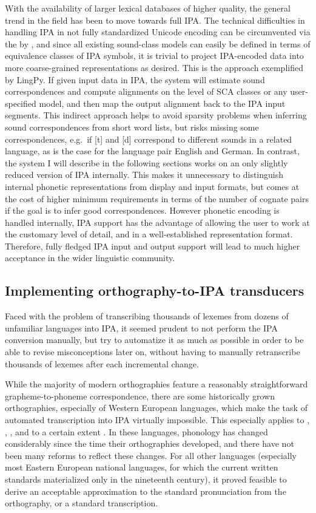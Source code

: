 With the availability of larger lexical databases of higher quality, the general trend in the field has been to move towards full IPA. The technical difficulties in handling IPA in not fully standardized Unicode encoding can be circumvented via the  by \cite{wells1995}, and since all existing sound-class models can easily be defined in terms of equivalence classes of IPA symbols, it is trivial to project IPA-encoded data into more coarse-grained representations as desired. This is the approach exemplified by LingPy. If given input data in IPA, the system will estimate sound correspondences and compute alignments on the level of SCA classes or any user-specified model, and then map the output alignment back to the IPA input segments. This indirect approach helps to avoid sparsity problems when inferring sound correspondences from short word lists, but risks missing some correspondences, e.g.\ if [t] and [d] correspond to different sounds in a related language, as is the case for the language pair English and German. In contrast, the system I will describe in the following sections works on an only slightly reduced version of IPA internally. This makes it unnecessary to distinguish internal phonetic representations from display and input formats, but comes at the cost of higher minimum requirements in terms of the number of cognate pairs if the goal is to infer good correspondences. However phonetic encoding is handled internally, IPA support has the advantage of allowing the user to work at the customary level of detail, and in a well-established representation format. Therefore, fully fledged IPA input and output support will lead to much higher acceptance in the wider linguistic community.

\subsection{Implementing orthography-to-IPA transducers}
Faced with the problem of transcribing thousands of lexemes from dozens of unfamiliar languages into IPA, it seemed prudent to not perform the IPA conversion manually, but try to automatize it as much as possible in order to be able to revise misconceptions later on, without having to manually retranscribe thousands of lexemes after each incremental change.

While the majority of modern orthographies feature a reasonably straightforward grapheme-to-phoneme correspondence, there are some historically grown orthographies, especially of Western European languages, which make the task of automated transcription into IPA virtually impossible. This especially applies to , , , and to a certain extent . In these languages, phonology has changed considerably since the time their orthographies developed, and there have not been many reforms to reflect these changes. For all other languages (especially most Eastern European national languages, for which the current written standards materialized only in the nineteenth century), it proved feasible to derive an acceptable approximation to the standard pronunciation from the orthography, or a standard transcription.

